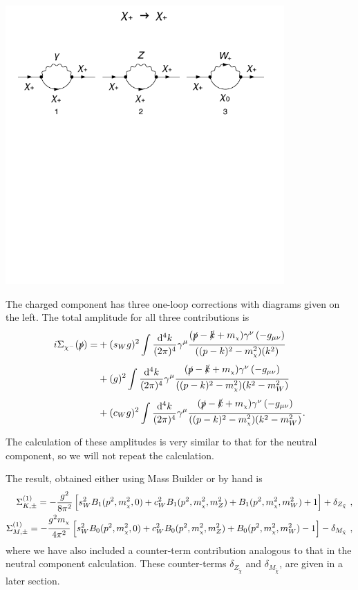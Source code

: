 \documentclass[11pt]{article}
\newcommand{\mychi}{\raisebox{0pt}[1ex][1ex]{\tiny$\chi$}}
\def\cm{\chi^-}
\renewcommand{\d}{\ensuremath{\operatorname{d}\!}}
\def\mc{m_{\mychi}}
\newcommand{\mb}{\textsf{Mass Builder} }
\begin{document}
\begin{minipage}{0.3\textwidth}
\includegraphics[width=0.8\textwidth]{F1_1_c.pdf}
\end{minipage}
\noindent\begin{minipage}{0.7\textwidth}

The charged component has three one-loop corrections with diagrams given on the left.  The total amplitude for all three contributions is
\begin{align}
\begin{split}
i\Sigma_{\cm}(\slashed{p})=
&+(s_Wg)^2 \int \frac{\d^4k}{(2\pi)^4} \gamma^{\mu}\frac{(\slashed{p}-\slashed{k}+\mc)\gamma^{\nu}\left(-g_{\mu\nu}\right)}{((p-k)^2-\mc^2)(k^2)}\\
&+(g)^2 \int \frac{\d^4k}{(2\pi)^4} \gamma^{\mu}\frac{(\slashed{p}-\slashed{k}+\mc)\gamma^{\nu}\left(-g_{\mu\nu}\right)}{((p-k)^2-\mc^2)(k^2-m_W^2)}\\
&+(c_Wg)^2 \int \frac{\d^4k}{(2\pi)^4} \gamma^{\mu}\frac{(\slashed{p}-\slashed{k}+\mc)\gamma^{\nu}\left(-g_{\mu\nu}\right)}{((p-k)^2-\mc^2)(k^2-m_W^2)}.
\end{split}
\end{align}
The calculation of these amplitudes is very similar to that for the neutral component, so we will not repeat the calculation. 

\end{minipage}
The result, obtained either using \mb or by hand is
{
\begin{eqnarray}
\Sigma_{K, \pm}^{(1)} =
-\frac{g^2}{8\pi^2}
\left[ s_W^2 B_1(p^2,\mc^2,0)
+c_W^2 B_1(p^2,\mc^2, m_Z^2)
+B_1(p^2, \mc^2, m_W^2) + 1  \right]
+ \delta_{Z_{\tilde{\chi}}}\ , \label{eq: Cha_K} \\
\Sigma_{M, \pm}^{(1)} =
-\frac{g^2 \mc}{4\pi^2}
\left[ s_W^2 B_0(p^2, \mc^2,0)
+c_W^2 B_0(p^2, \mc^2, m_Z^2)
+B_0(p^2, \mc^2, m_W^2) - 1 \right]
-\delta_{M_{\tilde{\chi}}}\ ,
 \label{eq: Cha_M}
\end{eqnarray}
}
where we have also included a counter-term contribution analogous to that in the neutral component calculation.  These counter-terms $\delta_{Z_{\tilde{\chi}}}$ and $\delta_{M_{\tilde{\chi}}}$, are given in a later section.
\end{document}
